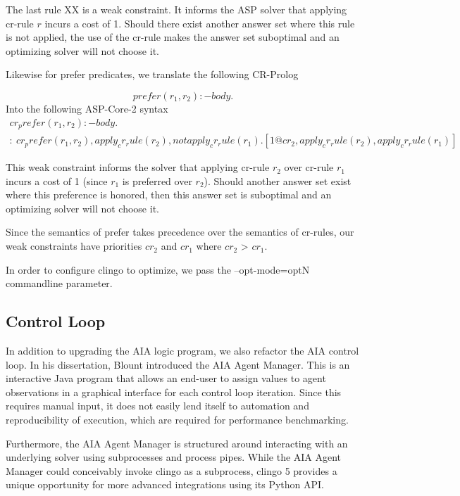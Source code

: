 The last rule XX is a weak constraint.
It informs the ASP solver that applying cr-rule $r$ incurs a cost of 1.
Should there exist another answer set where this rule is not applied, the use of the cr-rule makes the answer set suboptimal and an optimizing solver will not choose it.

Likewise for prefer predicates, we translate the following CR-Prolog

\begin{equation}
    prefer(r_1, r_2) :- body.
\end{equation}
Into the following ASP-Core-2 syntax
\begin{gather}
    cr_prefer(r_1, r_2) :- body. \\
    :~ cr_prefer(r_1, r_2), apply_cr_rule(r_2), not apply_cr_rule(r_1).
    [1@cr_2, apply_cr_rule(r_2), apply_cr_rule(r_1)]
\end{gather}

This weak constraint informs the solver that applying cr-rule $r_2$ over cr-rule $r_1$ incurs a cost of 1 (since $r_1$ is preferred over $r_2$).
Should another answer set exist where this preference is honored, then this answer set is suboptimal and an optimizing solver will not choose it.

Since the semantics of prefer takes precedence over the semantics of cr-rules, our weak constraints have priorities $cr_2$ and $cr_1$ where $cr_2$ > $cr_1$.

In order to configure clingo to optimize, we pass the --opt-mode=optN commandline parameter.

\subsection{Control Loop}

In addition to upgrading the AIA logic program, we also refactor the AIA control loop.
In his dissertation, Blount introduced the AIA Agent Manager.
This is an interactive Java program that allows an end-user to assign values to agent observations in a graphical interface for each control loop iteration.
Since this requires manual input, it does not easily lend itself to automation and reproducibility of execution, which are required for performance benchmarking.

Furthermore, the AIA Agent Manager is structured around interacting with an underlying solver using subprocesses and process pipes.
While the AIA Agent Manager could conceivably invoke clingo as a subprocess, clingo 5 provides a unique opportunity for more advanced integrations using its Python API.

